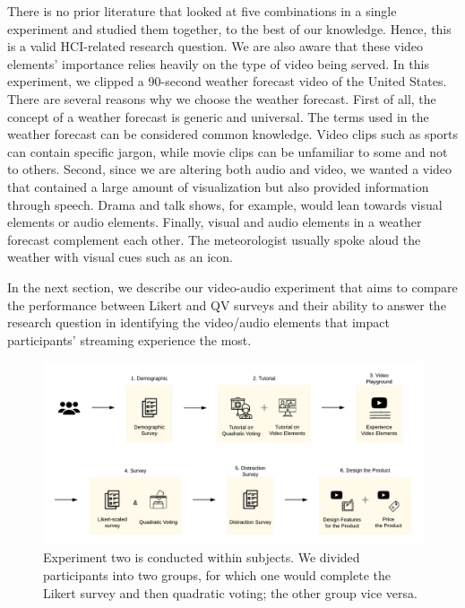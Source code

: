 There is no prior literature that looked at five combinations in a single experiment and studied them together, to the best of our knowledge. Hence, this is a valid HCI-related research question. We are also aware that these video elements' importance relies heavily on the type of video being served. In this experiment, we clipped a 90-second weather forecast video of the United States. There are several reasons why we choose the weather forecast. First of all, the concept of a weather forecast is generic and universal. The terms used in the weather forecast can be considered common knowledge. Video clips such as sports can contain specific jargon, while movie clips can be unfamiliar to some and not to others. Second, since we are altering both audio and video, we wanted a video that contained a large amount of visualization but also provided information through speech. Drama and talk shows, for example, would lean towards visual elements or audio elements. Finally, visual and audio elements in a weather forecast complement each other. The meteorologist usually spoke aloud the weather with visual cues such as an icon.

In the next section, we describe our video-audio experiment that aims to compare the performance between Likert and QV surveys and their ability to answer the research question in identifying the video/audio elements that impact participants' streaming experience the most.

\begin{figure}[htpb]
    \centering
    \includegraphics[width=\textwidth, keepaspectratio=true]{content/image/exp2_procedure.pdf}
    \caption{
        Experiment two is conducted within subjects. We divided participants into two groups, for which one would complete the Likert survey and then quadratic voting; the other group vice versa.
    }
    \label{fig:exp2_flow}
\end{figure}

